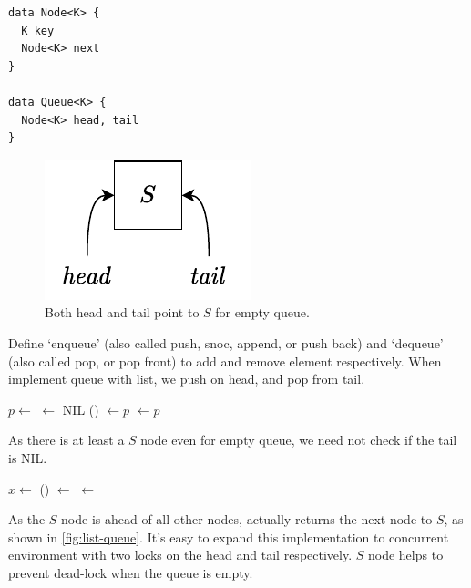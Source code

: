 \documentclass[b5paper]{article}
\begin{document}
\lstset{frame = single}
\begin{lstlisting}[language = Bourbaki]
data Node<K> {
  K key
  Node<K> next
}

data Queue<K> {
  Node<K> head, tail
}
\end{lstlisting}

\begin{figure}[htbp]
  \centering
  \includegraphics[scale=0.8]{img/empty-list}
  \caption{Both head and tail point to $S$ for empty queue.}
  \label{fig:empty-list}
\end{figure}

Define `enqueue' (also called push, snoc, append, or push back) and `dequeue' (also called pop, or pop front) to add and remove element respectively. When implement queue with list, we push on head, and pop from tail.

\begin{algorithmic}[1]
  \State $p \gets $ 
  \State {} $\gets$ NIL
  \State {}() $\gets p$
  \State {} $\gets p$
\EndFunction
\end{algorithmic}

As there is at least a $S$ node even for empty queue, we need not check if the tail is NIL.

\begin{algorithmic}[1]
  \State $x \gets $ 
  \State {}() $\gets$ 
   
    \State {} $\gets$ 
  \EndIf
  \State \Return {}
\EndFunction
\end{algorithmic}

As the $S$ node is ahead of all other nodes,  actually returns the next node to $S$, as shown in \cref{fig:list-queue}. It's easy to expand this implementation to concurrent environment with two locks on the head and tail respectively. $S$ node helps to prevent dead-lock when the queue is empty\cite{PODC96}\cite{SutterDDJ}.
\end{document}
